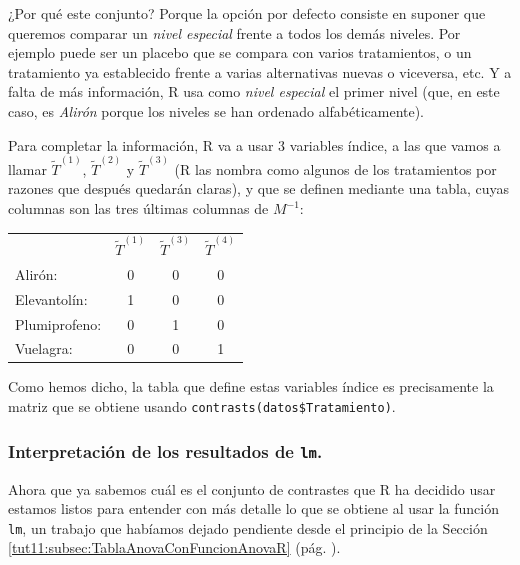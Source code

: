 \documentclass[10pt,a4paper]{article}\usepackage[]{graphicx}\usepackage[]{color}
\newcounter {cont01}
\begin{document}
¿Por qué este conjunto? Porque la opción por defecto consiste en suponer que queremos comparar un {\em nivel especial} frente a todos los demás niveles. Por ejemplo puede ser un placebo que se compara con varios tratamientos, o un tratamiento ya establecido frente a varias alternativas nuevas o viceversa, etc. Y a  falta de más información, R usa como {\em nivel especial} el primer nivel (que, en este caso, es {\em Alirón} porque los niveles se han ordenado alfabéticamente).

Para completar la información, R va a usar 3 variables índice, a las que vamos a llamar
$\tilde{T}^{(1)}$, $\tilde{T}^{(2)}$ y $\tilde{T}^{(3)}$ (R las nombra como algunos de los tratamientos por razones que después quedarán claras),
y que se definen mediante una tabla, cuyas columnas son las tres últimas columnas de $M^{-1}$:
\begin{center}
\begin{tabular}{l|c|c|c|}
\cline{2-4}
            \rule{0mm}{5mm}   & $\tilde{T}^{(1)}$&$\tilde{T}^{(3)}$&$\tilde{T}^{(4)}$ \\
\cline{2-4}
\mbox{Alirón:}&0&0&0 \\
\cline{2-4}
\mbox{Elevantolín:}&1&0&0 \\
\cline{2-4}
\mbox{Plumiprofeno:}&0&1&0 \\
\cline{2-4}
\mbox{Vuelagra:}&0&0&1 \\
\cline{2-4}
\end{tabular}
\end{center}
Como hemos dicho, la tabla que define estas variables índice es precisamente la matriz que se obtiene usando {\tt contrasts(datos\$Tratamiento)}.

\subsubsection*{Interpretación de los resultados de {\tt lm}.}
\label{tut11:subsubsec:InterpretacionResultadosLm}

Ahora que ya sabemos cuál es el conjunto de contrastes que R ha decidido usar estamos listos para entender con más detalle lo que se obtiene al usar la función {\tt lm}, un trabajo que habíamos dejado pendiente desde el principio de la Sección \ref{tut11:subsec:TablaAnovaConFuncionAnovaR} (pág. \pageref{tut11:subsec:TablaAnovaConFuncionAnovaR}).
\end{document}

